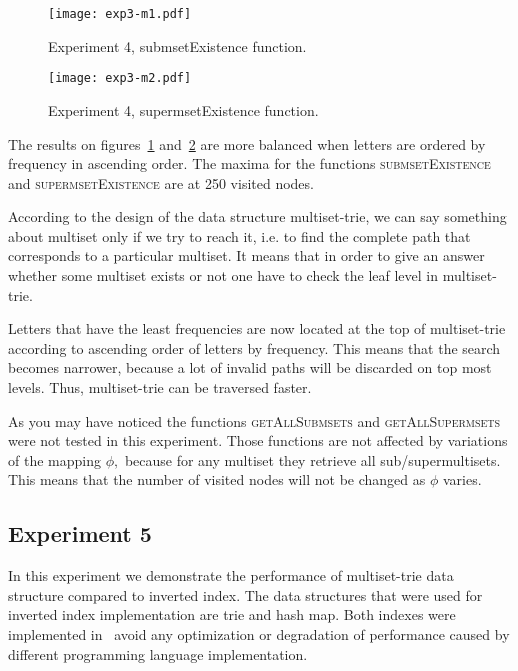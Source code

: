 \begin{figure}
\center
\texttt{[image: exp3-m1.pdf]}
\caption{Experiment 4, submsetExistence function.}
\label{fig:e4m1}
\end{figure}

\begin{figure}
\center
\texttt{[image: exp3-m2.pdf]}
\caption{Experiment 4, supermsetExistence function.}
\label{fig:e4m2}
\end{figure}

%

The results on figures~\ref{fig:e4m1} and~\ref{fig:e4m2} are more balanced when 
letters are ordered by frequency in ascending order. The maxima for the functions 
\textsc{submsetExistence} and \textsc{supermsetExistence} are at 250 visited nodes. 

According to the design of the data structure multiset-trie, we can say 
something about multiset only if we try to reach it, i.e. to find the complete 
path that corresponds to a particular multiset. It means that in order to give 
an answer whether some multiset exists or not one have to check the leaf level in 
multiset-trie. 

Letters that have the least frequencies are now located at the top of 
multiset-trie according to ascending order of letters by frequency. This means 
that the search becomes narrower, because a lot of invalid paths will be 
discarded on top most levels. Thus, multiset-trie can be traversed faster.

As you may have noticed the functions \textsc{getAllSubmsets} and 
\textsc{getAllSupermsets} were not tested in this experiment. Those functions 
are not affected by variations of the mapping $\phi,$ because for any multiset 
they retrieve all sub/supermultisets. This means that the number of visited 
nodes will not be changed as $\phi$ varies.

\subsection{Experiment 5} \label{s:exp5}
In this experiment we demonstrate the performance of multiset-trie data structure 
compared to inverted index. The data structures that were used for inverted index 
implementation are trie and hash map. Both indexes were implemented in~ 
avoid any optimization or degradation of performance caused by different programming 
language implementation.

